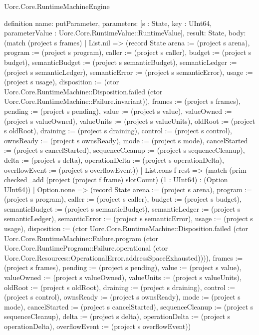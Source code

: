 \begin{lexlean}{Uorc.Core.RuntimeMachineEngine}
\begin{semanticmodule}
definition{
  name: putParameter,
  parameters: [s : State, key : UInt64, parameterValue : Uorc.Core.RuntimeValue::RuntimeValue],
  result: State,
  body: (match (project s frames)
    | List.nil => (record State {arena := (project s arena), program := (project s program), caller := (project s caller), budget := (project s budget), semanticBudget := (project s semanticBudget), semanticLedger := (project s semanticLedger), semanticError := (project s semanticError), usage := (project s usage), disposition := (ctor Uorc.Core.RuntimeMachine::Disposition.failed (ctor Uorc.Core.RuntimeMachine::Failure.invariant)), frames := (project s frames), pending := (project s pending), value := (project s value), valueOwned := (project s valueOwned), valueUnits := (project s valueUnits), oldRoot := (project s oldRoot), draining := (project s draining), control := (project s control), ownsReady := (project s ownsReady), mode := (project s mode), cancelStarted := (project s cancelStarted), sequenceCleanup := (project s sequenceCleanup), delta := (project s delta), operationDelta := (project s operationDelta), overflowEvent := (project s overflowEvent)})
    | List.cons f rest => (match (prim checked_add (project (project f frame) slotCount) (1 : UInt64) : (Option UInt64))
      | Option.none => (record State {arena := (project s arena), program := (project s program), caller := (project s caller), budget := (project s budget), semanticBudget := (project s semanticBudget), semanticLedger := (project s semanticLedger), semanticError := (project s semanticError), usage := (project s usage), disposition := (ctor Uorc.Core.RuntimeMachine::Disposition.failed (ctor Uorc.Core.RuntimeMachine::Failure.program (ctor Uorc.Core.RuntimeProgram::Failure.operational (ctor Uorc.Core.Resources::OperationalError.addressSpaceExhausted)))), frames := (project s frames), pending := (project s pending), value := (project s value), valueOwned := (project s valueOwned), valueUnits := (project s valueUnits), oldRoot := (project s oldRoot), draining := (project s draining), control := (project s control), ownsReady := (project s ownsReady), mode := (project s mode), cancelStarted := (project s cancelStarted), sequenceCleanup := (project s sequenceCleanup), delta := (project s delta), operationDelta := (project s operationDelta), overflowEvent := (project s overflowEvent)})
}
\end{semanticmodule}
\end{lexlean}
